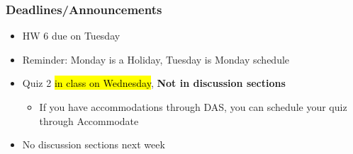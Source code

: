 
\begin{frame}
    \frametitle{Deadlines/Announcements}
\begin{itemize}
            \item HW 6 due on Tuesday
            \item Reminder: Monday is a Holiday, Tuesday is Monday schedule
            \item Quiz 2 \hl{in class on Wednesday}, \textbf{Not in discussion sections}
            \begin{itemize}
                \item If you have accommodations through DAS, you can schedule your quiz through Accommodate
            \end{itemize}
            \item No discussion sections next week
        \end{itemize}
\end{frame}
